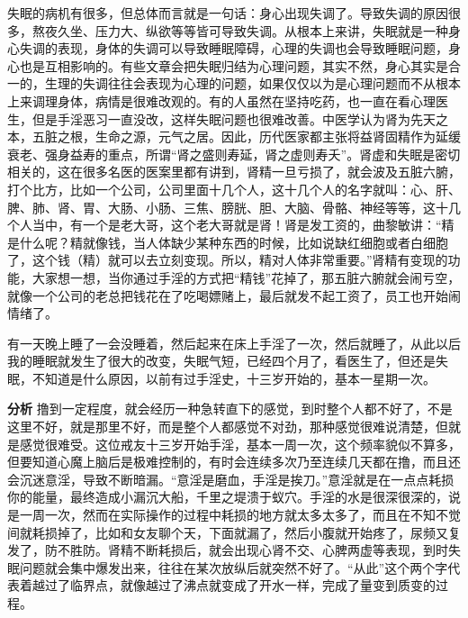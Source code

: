 失眠的病机有很多，但总体而言就是一句话：身心出现失调了。导致失调的原因很多，熬夜久坐、压力大、纵欲等等皆可导致失调。从根本上来讲，失眠就是一种身心失调的表现，身体的失调可以导致睡眠障碍，心理的失调也会导致睡眠问题，身心也是互相影响的。有些文章会把失眠归结为心理问题，其实不然，身心其实是合一的，生理的失调往往会表现为心理的问题，如果仅仅以为是心理问题而不从根本上来调理身体，病情是很难改观的。有的人虽然在坚持吃药，也一直在看心理医生，但是手淫恶习一直没改，这样失眠问题也很难改善。中医学认为肾为先天之本，五脏之根，生命之源，元气之居。因此，历代医家都主张将益肾固精作为延缓衰老、强身益寿的重点，所谓“肾之盛则寿延，肾之虚则寿夭”。肾虚和失眠是密切相关的，这在很多名医的医案里都有讲到，肾精一旦亏损了，就会波及五脏六腑，打个比方，比如一个公司，公司里面十几个人，这十几个人的名字就叫：心、肝、脾、肺、肾、胃、大肠、小肠、三焦、膀胱、胆、大脑、骨骼、神经等等，这十几个人当中，有一个是老大哥，这个老大哥就是肾！肾是发工资的，曲黎敏讲：“精是什么呢？精就像钱，当人体缺少某种东西的时候，比如说缺红细胞或者白细胞了，这个钱（精）就可以去立刻变现。所以，精对人体非常重要。”肾精有变现的功能，大家想一想，当你通过手淫的方式把“精钱”花掉了，那五脏六腑就会闹亏空，就像一个公司的老总把钱花在了吃喝嫖赌上，最后就发不起工资了，员工也开始闹情绪了。

\begin{case}
    有一天晚上睡了一会没睡着，然后起来在床上手淫了一次，然后就睡了，从此以后我的睡眠就发生了很大的改变，失眠气短，已经四个月了，看医生了，但还是失眠，不知道是什么原因，以前有过手淫史，十三岁开始的，基本一星期一次。

    \textbf{分析} 撸到一定程度，就会经历一种急转直下的感觉，到时整个人都不好了，不是这里不好，就是那里不好，而是整个人都感觉不对劲，那种感觉很难说清楚，但就是感觉很难受。这位戒友十三岁开始手淫，基本一周一次，这个频率貌似不算多，但要知道心魔上脑后是极难控制的，有时会连续多次乃至连续几天都在撸，而且还会沉迷意淫，导致不断暗漏。“意淫是磨血，手淫是挨刀。”意淫就是在一点点耗损你的能量，最终造成小漏沉大船，千里之堤溃于蚁穴。手淫的水是很深很深的，说是一周一次，然而在实际操作的过程中耗损的地方就太多太多了，而且在不知不觉间就耗损掉了，比如和女友聊个天，下面就漏了，然后小腹就开始疼了，尿频又复发了，防不胜防。肾精不断耗损后，就会出现心肾不交、心脾两虚等表现，到时失眠问题就会集中爆发出来，往往在某次放纵后就突然不好了。“从此”这个两个字代表着越过了临界点，就像越过了沸点就变成了开水一样，完成了量变到质变的过程。
\end{case}

